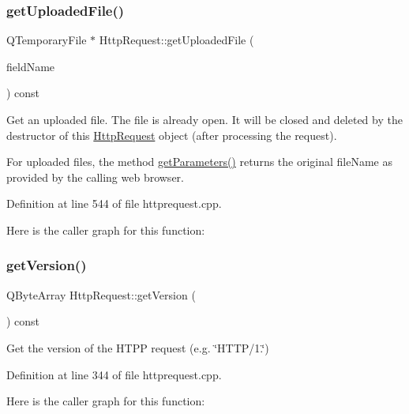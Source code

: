 \subsubsection{\texorpdfstring{get\+Uploaded\+File()}{getUploadedFile()}}
{\footnotesize\ttfamily Q\+Temporary\+File $\ast$ Http\+Request\+::get\+Uploaded\+File (\begin{DoxyParamCaption}\item[{const Q\+Byte\+Array}]{field\+Name }\end{DoxyParamCaption}) const}

Get an uploaded file. The file is already open. It will be closed and deleted by the destructor of this \mbox{\hyperlink{classstefanfrings_1_1_http_request}{Http\+Request}} object (after processing the request). 

For uploaded files, the method \mbox{\hyperlink{classstefanfrings_1_1_http_request_a0711a770d0547a75f5cfb68c9ac1a760}{get\+Parameters()}} returns the original file\+Name as provided by the calling web browser. 

Definition at line 544 of file httprequest.\+cpp.

Here is the caller graph for this function\+:
\mbox{\label{classstefanfrings_1_1_http_request_adfd550673eb70a6477b0c04eb2023bad}} 
\subsubsection{\texorpdfstring{get\+Version()}{getVersion()}}
{\footnotesize\ttfamily Q\+Byte\+Array Http\+Request\+::get\+Version (\begin{DoxyParamCaption}{ }\end{DoxyParamCaption}) const}

Get the version of the H\+T\+PP request (e.\+g. \char`\"{}\+H\+T\+T\+P/1.\char`\"{}) 

Definition at line 344 of file httprequest.\+cpp.

Here is the caller graph for this function\+:
\mbox{\label{classstefanfrings_1_1_http_request_a87e7ca425b96545e062454f66e346caf}} 
